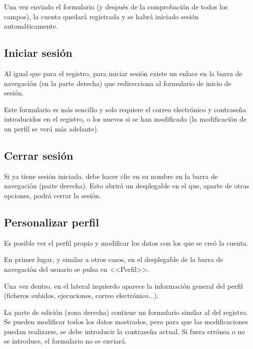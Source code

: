 
Una vez enviado el formulario (y después de la comprobación de todos los
campos), la cuenta quedará registrada y se habrá iniciado sesión
automáticamente.

\subsection{Iniciar sesión}

Al igual que para el registro, para iniciar sesión existe un enlace en la barra
de navegación (en la parte derecha) que redirecciona al formulario de inicio de
sesión.


Este formulario es más sencillo y solo requiere el correo electrónico y
contraseña introducidos en el registro, o los nuevos si se han modificado (la
modificación de un perfil se verá más adelante).

\subsection{Cerrar sesión}

Si ya tiene sesión iniciada, debe hacer clic en su nombre en la barra de
navegación (parte derecha). Esto abrirá un desplegable en el que, aparte de
otras opciones, podrá cerrar la sesión.


\subsection{Personalizar perfil}

Es posible ver el perfil propio y modificar los datos con los que se creó la
cuenta.

En primer lugar, y similar a otros casos, en el desplegable de la barra de
navegación del usuario se pulsa en <<Perfil>>.


Una vez dentro, en el lateral izquierdo aparece la información general del
perfil (ficheros subidos, ejecuciones, correo electrónico...).

La parte de edición (zona derecha) contiene un formulario similar al del
registro. Se pueden modificar todos los datos mostrados, pero para que las
modificaciones puedan realizarse, se debe introducir la contraseña actual. Si
fuera errónea o no se introduce, el formulario no se enviará.

